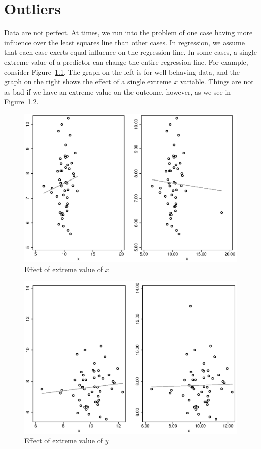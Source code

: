 



\chapter{Outliers}

Data are not perfect. At times, we run into the problem of one case having more influence over the least squares line than other cases. In regression, we assume that each case exerts equal influence on the regression line. In some cases, a single extreme value of a predictor can change the entire regression line. For example, consider Figure~\ref{fig:xout}. The graph on the left is for well behaving data, and the graph on the right shows the effect of a single extreme $x$ variable. Things are not as bad if we have an extreme value on the outcome, however, as we see in Figure~\ref{fig:yout}.

\begin{figure}
   \centering
   \includegraphics[angle=0,
           width=.75\textwidth]{xout.eps}
   \caption{Effect of extreme value of $x$}
  \label{fig:xout}
\end{figure}

\begin{figure}
   \centering
   \includegraphics[angle=0,
           width=.75\textwidth]{yout.eps}
   \caption{Effect of extreme value of $y$}
  \label{fig:yout}
\end{figure}

